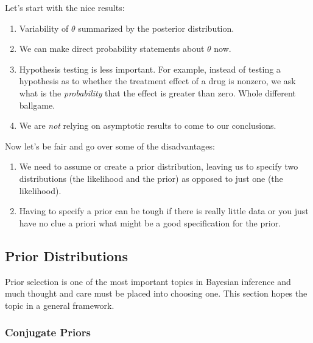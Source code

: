\documentclass[12pt]{article}
\theoremstyle{plain}
\theoremstyle{definition}
\theoremstyle{remark}
\begin{document}
Let's start with the nice results:
\begin{enumerate}
   \item{Variability of $\theta$ summarized by the posterior
      distribution.}
   \item{We can make direct probability statements about $\theta$ now.}
   \item{Hypothesis testing is less important.  For example, instead
      of testing a hypothesis as to whether the treatment effect of a
      drug is nonzero, we ask what is the \emph{probability} that
      the effect is greater than zero. Whole different ballgame.}
   \item{We are \emph{not} relying on asymptotic results to come
      to our conclusions.}
\end{enumerate}
Now let's be fair and go over some of the disadvantages:
\begin{enumerate}
   \item{We need to assume or create a prior distribution, leaving
      us to specify two distributions (the likelihood and the
      prior) as opposed to just one (the likelihood).
   }
   \item{Having to specify a prior can be tough if there is really
      little data or you just have no clue a priori what might
      be a good specification for the prior.}
\end{enumerate}

\newpage

\subsection{Prior Distributions}

Prior selection is one of the most important topics in Bayesian inference
and much thought and care must be placed into choosing one. This section
hopes the topic in a general framework.


\subsubsection{Conjugate Priors}
\end{document}
